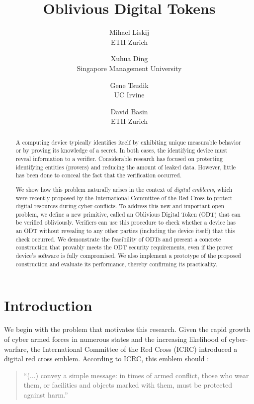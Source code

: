 \documentclass[letterpaper,twocolumn,10pt]{article}
\begin{document}
\title{Oblivious Digital Tokens}

\author{
    {\rm Mihael Liskij}\\
    ETH Zurich
    \and
    {\rm Xuhua Ding}\\
    Singapore Management University
    \and
    {\rm Gene Tsudik}\\
    UC Irvine
    \and
    {\rm David Basin}\\
    ETH Zurich
}

\maketitle

\begin{abstract}
A computing device typically identifies itself by exhibiting unique measurable behavior or by proving its knowledge of a secret.
In both cases, the identifying device must reveal information to a verifier.
Considerable research has focused on protecting identifying entities (provers) and reducing the amount of leaked data.
However, little has been done to conceal the fact that the verification occurred.

We show how this problem naturally arises in the context of {\em digital emblems}, which were recently proposed by the International Committee of the Red Cross to protect digital resources during cyber-conflicts. To address this new and important open problem, we define a new primitive, called an Oblivious Digital Token (ODT) that can be verified obliviously. Verifiers can use this procedure to check whether a device has an ODT without revealing to any other parties (including the device itself) that this check occurred. We demonstrate the feasibility of ODTs and present a concrete construction that
provably meets the ODT security requirements, even if the prover device's software is fully compromised. We also implement a prototype of the proposed construction and evaluate its performance, thereby confirming its practicality.

\end{abstract}

\pagestyle{plain}
\section{Introduction}
\label{sec:intro}
%
We begin with the problem that motivates this research.
%
Given the rapid growth of cyber armed forces in numerous states and the increasing likelihood of
cyber-warfare, the International Committee of the Red Cross (ICRC) introduced a digital
red cross emblem. According to ICRC, this emblem should \cite{icrc}:
\begin{quote}
``(...) convey a simple message: in times of armed conflict, those who wear them, or
facilities and objects marked with them, must be protected against harm.''
\end{quote}
\end{document}
